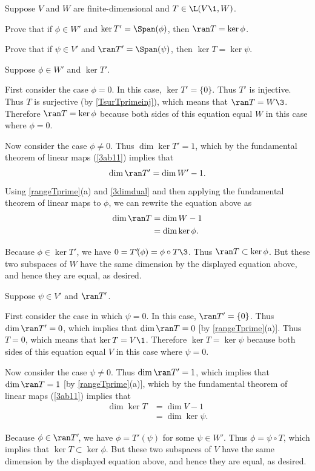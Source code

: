 \exercise
Suppose $V$ and $W$ are finite-dimensional and $T \in \L(V\1, W)$.
\begin{subtheorem}
\item
Prove that if $\phi \in W'$ and $\ker T' = \Span(\phi)$, then $\ran T = \ker \phi$.
\item
Prove that if $\psi \in V'$ and $\ran T' = \Span(\psi)$, then $\ker T = \ker \psi$.
\end{subtheorem}
\exercisesubtheoremend

\begin{Solution}
\begin{subtheorem}
\item
Suppose $\phi \in W'$ and $\ker T'$.

First consider the case $\phi = 0$. In this case, $\ker T' = \{0\}$. Thus $T'$ is injective. Thus $T$ is surjective (by \ref{TsurTprimeinj}), which means that $\ran T = W\3$. Therefore $\ran T = \ker \phi$ because both sides of this equation equal $W$ in this case where $\phi = 0$.

Now consider the case $\phi \ne 0$. Thus $\dim \ker T' = 1$, which by the fundamental theorem of linear maps (\ref{3ab11}) implies that
\[
\dim \ran T' = \dim W' - 1.
\]
Using \ref{rangeTprime}(a) and \ref{3dimdual} and then applying the fundamental theorem of linear maps to $\phi$, we can rewrite the equation above as
\begin{align*}
\dim \ran T &= \dim W - 1 \\
&= \dim \ker \phi.
\end{align*}

Because $\phi \in \ker T'$, we have $0 = T' \! (\phi) = \phi \circ T\3$. Thus $\ran T \subset \ker \phi$. But these two subspaces of $W$ have the same dimension by the displayed equation above, and hence they are equal, as desired.

\item
Suppose $\psi \in V'$ and $\ran T'$.

First consider the case in which $\psi = 0$. In this case, $\ran T' = \{0\}$. Thus $\dim \ran T' = 0$, which implies that $\dim \ran T = 0$ [by \ref{rangeTprime}(a)]. Thus $T = 0$, which means that $\ker T = V\1$. Therefore $\ker T = \ker \psi$ because both sides of this equation equal $V$ in this case where $\psi = 0$.

Now consider the case $\psi \ne 0$. Thus $\dim \ran T' = 1$, which implies that $\dim \ran T = 1$ [by \ref{rangeTprime}(a)], which by the fundamental theorem of linear maps (\ref{3ab11}) implies that
\begin{align*}
\dim \ker T &= \dim V - 1 \\
&= \dim \ker \psi.
\end{align*}

Because $\phi \in \ran T'\!$, we have $\phi = T' \! (\psi)$ for some $\psi \in W'\!$. Thus $\phi = \psi \circ T$, which implies that $\ker T \subset \ker \phi$. But these two subspaces of $V$ have the same dimension by the displayed equation above, and hence they are equal, as desired.
\end{subtheorem}
\end{Solution}

